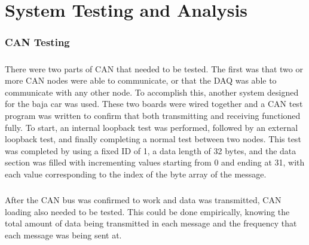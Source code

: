 \chapter{System Testing and Analysis}

\subsection{CAN Testing}

\paragraph{}
There were two parts of CAN that needed to be tested.
The first was that two or more CAN nodes were able to communicate, or that the DAQ was able to communicate with any other node.
To accomplish this, another system designed for the baja car was used.
These two boards were wired together and a CAN test program was written to confirm that both transmitting and receiving functioned fully.
To start, an internal loopback test was performed, followed by an external loopback test, and finally completing a normal test between two nodes.
This test was completed by using a fixed ID of 1, a data length of 32 bytes, and the data section was filled with incrementing values starting from 0 and ending at 31, with each value corresponding to the index of the byte array of the message.

\paragraph{}
After the CAN bus was confirmed to work and data was transmitted, CAN loading also needed to be tested.
This could be done empirically, knowing the total amount of data being transmitted in each message and the frequency that each message was being sent at.
